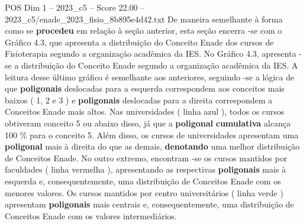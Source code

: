 \begin{textsample}{POS Dim 1 – 2023\_c5 – Score 22.00 – 2023\_c5/enade\_2023\_fisio\_8b895e4d42.txt}
De maneira semelhante à forma como se \textbf{procedeu} em relação à seção anterior, esta seção encerra -se com o Gráfico 4.3, que apresenta a distribuição do Conceito Enade dos cursos de Fisioterapia segundo a organização acadêmica da IES.
No Gráfico 4.3, apresenta -se a distribuição do Conceito Enade segundo a organização acadêmica da IES.
A leitura desse último gráfico é semelhante aos anteriores, seguindo -se a lógica de que \textbf{poligonais} deslocadas para a esquerda correspondem aos conceitos mais baixos ( 1, 2 e 3 ) e \textbf{poligonais} deslocadas para a direita correspondem a Conceitos Enade mais altos.
Nas universidades ( linha azul ), todos os cursos obtiveram conceito 5 ou abaixo disso, já que a \textbf{poligonal} \textbf{cumulativa} alcança 100 \% para o conceito 5.
Além disso, os cursos de universidades apresentam uma \textbf{poligonal} mais à direita do que as demais, \textbf{denotando} uma melhor distribuição de Conceitos Enade.
No outro extremo, encontram -se os cursos mantidos por faculdades ( linha vermelha ), apresentando as respectivas \textbf{poligonais} mais à esquerda e, consequentemente, uma distribuição de Conceitos Enade com os menores valores.
Os cursos mantidos por centro universitários ( linha verde ) apresentam \textbf{poligonais} mais centrais e, consequentemente, uma distribuição de Conceitos Enade com os valores intermediários.

\end{textsample}
